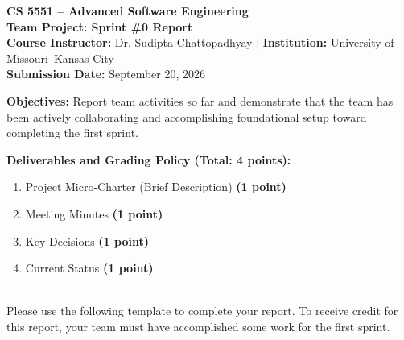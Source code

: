 \documentclass[11pt,letterpaper]{article}
\begin{document}

\begin{center}
    {\LARGE\bfseries\sffamily\color{headerdark} CS 5551 -- Advanced Software Engineering}\\[0.25em]
    {\huge\bfseries\sffamily\color{umkcblue} Team Project: Sprint \#0 Report}\\[0.4em]
    \normalsize\sffamily
    \textbf{Course Instructor:} Dr. Sudipta Chattopadhyay \quad$|$\quad 
    \textbf{Institution:} University of Missouri--Kansas City\\[0.2em]
    \textbf{Submission Date:} September 20, 2026
\end{center}

\vspace{0.4em}

\begin{tcolorbox}[sleekbox]
    \sffamily
    \textbf{\color{umkcblue}Objectives:} Report team activities so far and demonstrate that the team has been actively collaborating and accomplishing foundational setup toward completing the first sprint.
    
    \vspace{0.4em}
    \textbf{\color{umkcblue}Deliverables and Grading Policy (Total: 4 points):}
    \begin{enumerate}[topsep=2pt, itemsep=0pt, parsep=2pt, leftmargin=1.8em]
        \item Project Micro-Charter (Brief Description) \textbf{\color{umkcblue}(1 point)}
        \item Meeting Minutes \textbf{\color{umkcblue}(1 point)}
        \item Key Decisions \textbf{\color{umkcblue}(1 point)}
        \item Current Status \textbf{\color{umkcblue}(1 point)}
    \end{enumerate}
\end{tcolorbox}

\vspace{0.3em}
\\[0.2em]
\noindent\small Please use the following template to complete your report. To receive credit for this report, your team must have accomplished some work for the first sprint.
\end{document}
